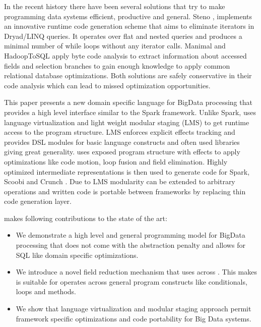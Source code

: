 In the recent history there have been several solutions that try to make programming data systems efficient, productive and general. Steno \cite{murray_steno:_2011}, implements an innovative runtime code generation scheme that aims to eliminate iterators in Dryad/LINQ queries. It operates over flat and nested queries and produces a minimal number of while loops without any iterator calls. Manimal \cite{cafarella_manimal:_2010} and HadoopToSQL \cite{iu_hadooptosql:_2010} apply byte code analysis to extract information about accessed fields and selection branches to gain enough knowledge to apply common relational database optimizations. Both solutions are safely conservative in their code analysis which can lead to missed optimization opportunities.         

This paper presents a new domain specific language \tool for BigData processing that provides a high level interface similar to the Spark framework. Unlike Spark, \tool uses language virtualization \cite{moors_scala-virtualized_2012} and light weight modular staging (LMS)\cite{rompf_lightweight_2010} to get runtime access to the program structure. LMS enforces explicit effects tracking and provides DSL modules for basic language constructs and often used libraries giving \tool great generality. \tool uses exposed program structure with effects to apply optimizations like code motion, loop fusion and field elimination. Highly optimized intermediate representations is then used to generate code for Spark, Scoobi \cite{nicta_scoobi_2012} and Crunch \cite{_crunch_2012}. Due to LMS modularity \tool can be extended to arbitrary operations and written code is portable between frameworks by replacing thin code generation layer. 
 

\tool makes following contributions to the state of the art:    
\begin{itemize}
  \item We demonstrate a high level and general programming model for BigData processing that does not come with the abstraction penalty and allows for SQL like domain specific optimizations.
  \item We introduce a novel field reduction mechanism that uses  across . This makes is suitable for operates across general program constructs like conditionals, loops and methods.
  \item We show that language virtualization and modular staging approach permit framework specific optimizations and code portability for Big Data systems.
\end{itemize} 

